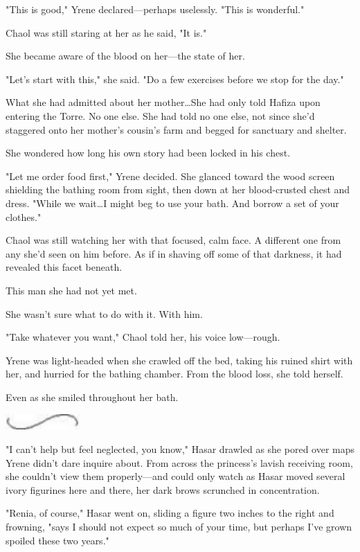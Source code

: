 "This is good," Yrene declared---perhaps uselessly.
"This is wonderful."

Chaol was still staring at her as he said, "It is."

She became aware of the blood on her---the state of her.

"Let's start with this," she said.
"Do a few exercises before we stop for the day."

What she had admitted about her mother\ldots She had only told Hafiza upon entering the Torre.
No one else.
She had told no one else, not since she'd staggered onto her mother's cousin's farm and begged for sanctuary and shelter.

She wondered how long his own story had been locked in his chest.

"Let me order food first," Yrene decided.
She glanced toward the wood screen shielding the bathing room from sight, then down at her blood-crusted chest and dress.
"While we wait\ldots I might beg to use your bath.
And borrow a set of your clothes."

Chaol was still watching her with that focused, calm face.
A different one from any she'd seen on him before.
As if in shaving off some of that darkness, it had revealed this facet beneath.

This man she had not yet met.

She wasn't sure what to do with it.
With him.

"Take whatever you want," Chaol told her, his voice low---rough.

Yrene was light-headed when she crawled off the bed, taking his ruined shirt with her, and hurried for the bathing chamber.
From the blood loss, she told herself.

Even as she smiled throughout her bath.

\begin{center}
	\includegraphics[width=1.12in,height=0.24in]{images/seperator}
\end{center}

"I can't help but feel neglected, you know," Hasar drawled as she pored over maps Yrene didn't dare inquire about.
From across the princess's lavish receiving room, she couldn't view them properly---and could only watch as Hasar moved several ivory figurines here and there, her dark brows scrunched in concentration.

"Renia, of course," Hasar went on, sliding a figure two inches to the right and frowning, "says I should not expect so much of your time, but perhaps I've grown spoiled these two years."

